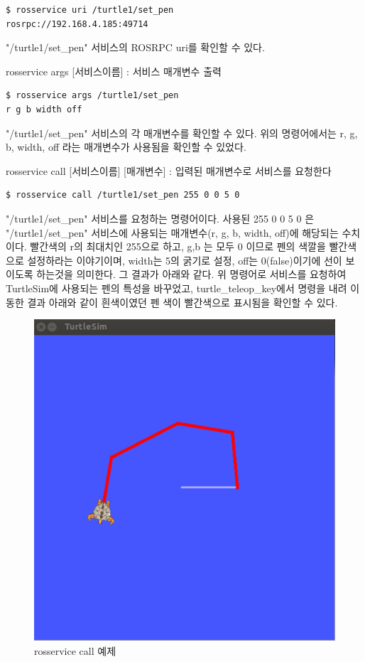 \begin{lstlisting}[language=ROS]
$ rosservice uri /turtle1/set_pen
rosrpc://192.168.4.185:49714
\end{lstlisting}

\noindent
"/turtle1/set\_pen" 서비스의 ROSRPC uri를 확인할 수 있다.

\vspace{\baselineskip}
\noindent
{}\circled{\thenum} rosservice args [서비스이름] : 서비스 매개변수 출력

\begin{lstlisting}[language=ROS]
$ rosservice args /turtle1/set_pen
r g b width off
\end{lstlisting}

\noindent
"/turtle1/set\_pen" 서비스의 각 매개변수를 확인할 수 있다. 위의 명령어에서는 r, g, b, width, off 라는 매개변수가 사용됨을 확인할 수 있었다.

\vspace{\baselineskip}
\noindent
{}\circled{\thenum}  rosservice call [서비스이름] [매개변수] : 입력된 매개변수로 서비스를 요청한다

\begin{lstlisting}[language=ROS]
$ rosservice call /turtle1/set_pen 255 0 0 5 0
\end{lstlisting}

\noindent
"/turtle1/set\_pen" 서비스를 요청하는 명령어이다. 사용된 255 0 0 5 0 은 "/turtle1/set\_pen" 서비스에 사용되는 매개변수(r, g, b, width, off)에 해당되는 수치이다.  빨간색의 r의 최대치인 255으로 하고, g,b 는 모두 0 이므로 펜의 색깔을 빨간색으로 설정하라는 이야기이며, width는 5의 굵기로 설정, off는 0(false)이기에 선이 보이도록 하는것을 의미한다. 그 결과가 아래와 같다. 위 명령어로 서비스를 요청하여 TurtleSim에 사용되는 펜의 특성을 바꾸었고, turtle\_teleop\_key에서 명령을 내려 이동한 결과 아래와 같이 흰색이였던 펜 색이 빨간색으로 표시됨을 확인할 수 있다.

\begin{figure}[h]
\centering\includegraphics[width=0.5\columnwidth]{pictures/chapter5/rosservice_call.png}
\caption{rosservice call 예제}
\end{figure}

